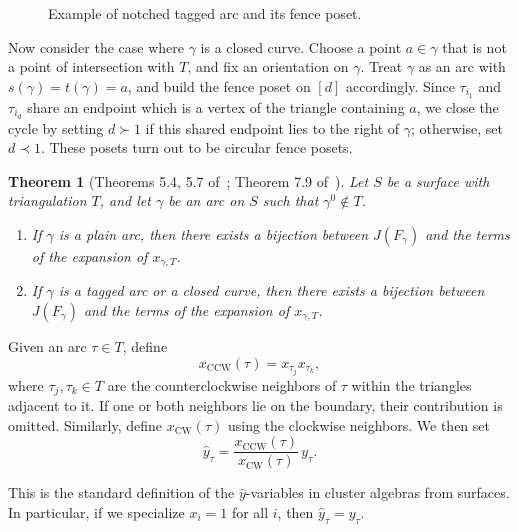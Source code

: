 \documentclass{article}
\newtheorem{theorem}{Theorem}
\theoremstyle{remark}
\begin{document}
\begin{figure}[htbp]

    \caption{Example of notched tagged arc and its fence poset.}
    \label{fig:exnotched}
\end{figure}

Now consider the case where \( \gamma \) is a closed curve. Choose a point \( a \in \gamma \) that is not a point of intersection with \( T \), and fix an orientation on \( \gamma \). Treat \( \gamma \) as an arc with \( s(\gamma) = t(\gamma) = a \), and build the fence poset on \( [d] \) accordingly. Since \( \tau_{i_1} \) and \( \tau_{i_d} \) share an endpoint which is a vertex of the triangle containing \( a \), we close the cycle by setting \( d \succ 1 \) if this shared endpoint lies to the right of \( \gamma \); otherwise, set \( d \prec 1 \). These posets turn out to be circular fence posets.

\begin{theorem}[Theorems 5.4, 5.7 of~\cite{musiker2011positivity}; Theorem 7.9 of~\cite{wilson2020surface}]\label{Thm:PMPoset}
Let \( S \) be a surface with triangulation \( T \), and let \( \gamma \) be an arc on \( S \) such that \( \gamma^0 \notin T \).
\begin{enumerate}
    \item If \( \gamma \) is a plain arc, then there exists a bijection between \( J(F_\gamma) \) and the terms of the expansion of $x_{\gamma,T}$.
    \item If \( \gamma \) is a tagged arc or a closed curve, then there exists a bijection between \( J(F_\gamma) \) and the terms of the expansion of $x_{\gamma,T}$.
\end{enumerate}
\end{theorem}

Given an arc \( \tau \in T \), define
\[
x_{\mathrm{CCW}}(\tau) = x_{\tau_j} x_{\tau_k},
\]
where \( \tau_j, \tau_k \in T \) are the counterclockwise neighbors of \( \tau \) within the triangles adjacent to it. If one or both neighbors lie on the boundary, their contribution is omitted. Similarly, define \( x_{\mathrm{CW}}(\tau) \) using the clockwise neighbors. We then set
\[
\hat{y}_{\tau} = \frac{x_{\mathrm{CCW}}(\tau)}{x_{\mathrm{CW}}(\tau)} \, y_{\tau}.
\]

This is the standard definition of the \( \hat{y} \)-variables in cluster algebras from surfaces. In particular, if we specialize \( x_i = 1 \) for all \( i \), then \( \hat{y}_\tau = y_\tau \).
\end{document}

